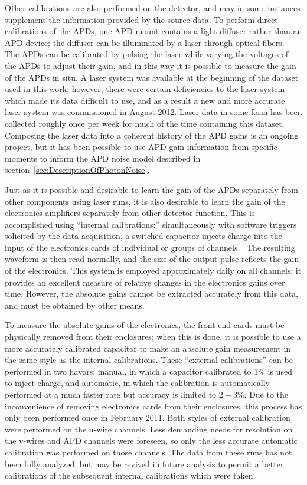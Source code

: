 Other calibrations are also performed on the detector, and may in some instances supplement the information provided by the source data.  To perform direct calibrations of the APDs, one APD mount contains a light diffuser rather than an APD device; the diffuser can be illuminated by a laser through optical fibers.~\cite{detectorPartI}  The APDs can be calibrated by pulsing the laser while varying the voltages of the APDs to adjust their gain, and in this way it is possible to measure the gain of the APDs in situ.  A laser system was available at the beginning of the dataset used in this work; however, there were certain deficiencies to the laser system which made its data difficult to use, and as a result a new and more accurate laser system was commissioned in August 2012.  Laser data in some form has been collected roughly once per week for much of the time containing this dataset.  Composing the laser data into a coherent history of the APD gains is an ongoing project, but it has been possible to use APD gain information from specific moments to inform the APD noise model described in section~\ref{sec:DescriptionOfPhotonNoise}.

Just as it is possible and desirable to learn the gain of the APDs separately from other components using laser runs, it is also desirable to learn the gain of the electronics amplifiers separately from other detector function.  This is accomplished using ``internal calibrations:'' simultaneously with software triggers solicited by the data acquisition, a switched capacitor injects charge into the input of the electronics cards of individual or groups of channels.~\cite{EXOElectronicsFunctionalSpecification}  The resulting waveform is then read normally, and the size of the output pulse reflects the gain of the electronics.  This system is employed approximately daily on all channels; it provides an excellent measure of relative changes in the electronics gains over time.  However, the absolute gains cannot be extracted accurately from this data, and must be obtained by other means.

To measure the absolute gains of the electronics, the front-end cards must be physically removed from their enclosures; when this is done, it is possible to use a more accurately calibrated capacitor to make an absolute gain measurement in the same style as the internal calibrations.  These ``external calibrations'' can be performed in two flavors: manual, in which a capacitor calibrated to $1\%$ is used to inject charge, and automatic, in which the calibration is automatically performed at a much faster rate but accuracy is limited to $2-3\%$.  Due to the inconvenience of removing electronics cards from their enclosures, this process has only been performed once in February 2011.  Both styles of external calibration were performed on the u-wire channels.  Less demanding needs for resolution on the v-wires and APD channels were foreseen, so only the less accurate automatic calibration was performed on those channels.  The data from these runs has not been fully analyzed, but may be revived in future analysis to permit a better calibrations of the subsequent internal calibrations which were taken.~\cite{EnergyDocumentRun2a}





